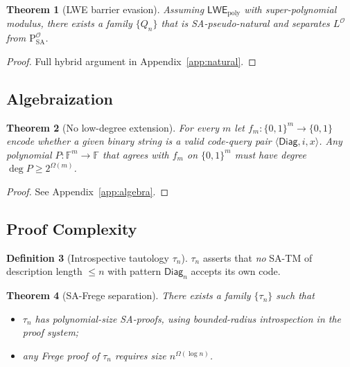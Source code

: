 \documentclass[12pt]{article}
\newcommand{\classP}{\mathrm{P}}
\newcommand{\SA}{\mathrm{SA}}
\newcommand{\OO}{\mathcal{O}}
\newcommand{\poly}{\mathrm{poly}}
\newcommand{\F}{\mathbb{F}}
\newcommand{\Diag}{\mathsf{Diag}}
\newcommand{\LWE}{\textsf{LWE}}
\newcommand{\Hamming}{\{0,1\}^m}
\theoremstyle{definition}
\newtheorem{definition}{Definition}[section]
\theoremstyle{plain}
\newtheorem{theorem}[definition]{Theorem}
\theoremstyle{remark}
\begin{document}
\begin{theorem}[LWE barrier evasion]\label{thm:lwe}
Assuming \(\LWE_{\poly}\) with super-polynomial modulus,
there exists a family \(\{Q_n\}\) that is SA-pseudo-natural
and separates \(L^\OO\) from \(\classP^{\OO}_{\SA}\).
\end{theorem}

\begin{proof}
Full hybrid argument in Appendix~\ref{app:natural}.
\end{proof}

\subsection{Algebraization}\label{subsec:algebra}

\begin{theorem}[No low-degree extension]\label{thm:algebra}
For every \(m\) let
\(f_m\colon\Hamming\to\{0,1\}\) encode
whether a given binary string is a valid code-query pair
\(\langle\Diag,i,x\rangle\).
Any polynomial \(P\!\colon\!\F^m\to\F\) that agrees with \(f_m\)
on \(\Hamming\) must have degree
\(\deg P \ge 2^{\Omega(m)}\).
\end{theorem}

\begin{proof}
See Appendix~\ref{app:algebra}.
\end{proof}

\subsection{Proof Complexity}\label{subsec:proof}

\begin{definition}[Introspective tautology \(\tau_n\)]
\(\tau_n\) asserts that
\emph{no} SA-TM of description length \(\le n\) with
pattern \(\Diag_n\) accepts its own code.
\end{definition}

\begin{theorem}[SA-Frege separation]\label{thm:proof}
There exists a family \(\{\tau_n\}\) such that
\begin{itemize}
  \item \(\tau_n\) has polynomial-size SA-proofs,
        using bounded-radius introspection in the proof system;
  \item any Frege proof of \(\tau_n\) requires size \(n^{\Omega(\log n)}\).
\end{itemize}
\end{theorem}
\end{document}
